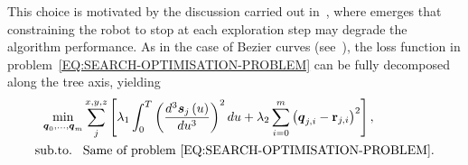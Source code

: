 This choice is motivated by the discussion carried out in~, where emerges that constraining the robot
to stop at each exploration step may degrade the algorithm performance.
As in the case of B\acuteacc ezier curves (see~), the loss function in
problem~\eqref{EQ:SEARCH-OPTIMISATION-PROBLEM} can be fully decomposed along the tree axis, yielding
\begin{equation*}
	\begin{split}
	\min_{\boldsymbol{q}_{0}, \dots, \boldsymbol{q}_{m}} &
				\sum_{j}^{x,y,z} \left[ \lambda_1 \int_0^{T} \left( \frac{d^3 \boldsymbol{s}_j \left( u \right)}{d u^3} \right)^2 d u
				+ \lambda_2 \sum_{i=0}^{m} \left( \boldsymbol{q}_{j,i} - \mathbf{r}_{j,i} \right)^2 \right], \\
	\text{sub.to.} \hspace{0.3cm} &
				\text{Same of problem~\eqref{EQ:SEARCH-OPTIMISATION-PROBLEM}}.
	\end{split}
\end{equation*}

